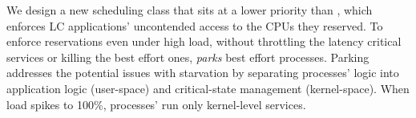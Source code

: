 We design a new scheduling class \beclass{} that sits at a lower priority than
\normalclass{}, which enforces LC applications' uncontended access to the CPUs
they reserved. To enforce reservations even under high load, without throttling
the latency critical services or killing the best effort ones, \beclass{}
\textit{parks} best effort processes. Parking addresses the potential issues
with starvation by separating \beclass{} processes' logic into application logic
(user-space) and critical-state management (kernel-space). When load spikes to
100\%, \beclass{} processes' run only kernel-level services.